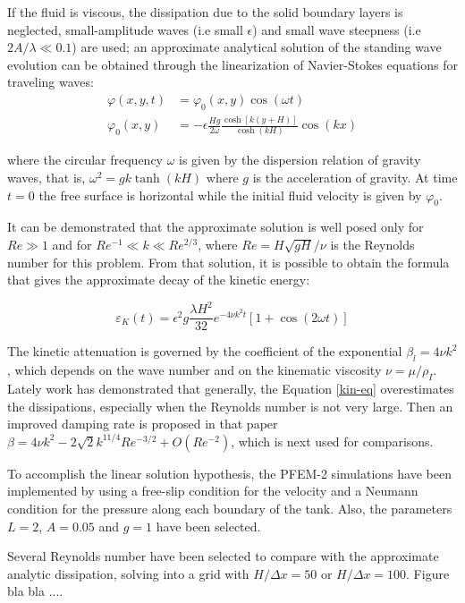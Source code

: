 \documentclass[a4paper,conference]{IEEEtran}
\begin{document}
If the fluid is viscous, the dissipation due to the solid boundary layers is neglected, small-amplitude waves (i.e small $\epsilon$) and small wave steepness (i.e $2A/\lambda \ll 0.1$) are used; an approximate analytical solution of the standing wave evolution can be obtained through the linearization of Navier-Stokes equations for traveling waves:
\begin{align}
 \varphi(x,y,t) & = \varphi_0(x,y)\cos(\omega t) \\
 \varphi_0(x,y) & =-\epsilon\frac{Hg}{2\omega}\frac{\cosh\left[k(y+H)\right]}{\cosh(kH)}\cos(kx)
\end{align}

where the circular frequency $\omega$ is given by the dispersion relation of gravity waves, that is, $\omega^2 = g k \tanh(kH)$ where $g$ is the acceleration of gravity. At time $t = 0$ the free surface is horizontal while the initial fluid velocity is given by $\varphi_0$.

It can be demonstrated that the approximate solution is well posed only for $Re\gg1$ and for $Re^{-1}\ll k \ll Re^{2/3}$, where $Re=H\sqrt{gH}/\nu$ is the Reynolds number for this problem. From that solution, it is possible to obtain the formula that gives the approximate decay of the kinetic energy\cite{Lighthill01}:

\begin{equation}
 \varepsilon_K(t) = \epsilon^2g\frac{\lambda H^2}{32}e^{-4\nu k^2t}\left[1+\cos(2\omega t)\right]
 \label{kin-eq}
\end{equation}

The kinetic attenuation is governed by the coefficient of the exponential $\beta_l = 4\nu k^2$, which depends on the wave number and on the kinematic viscosity $\nu = \mu/\rho_{I}$. Lately work\cite{Antuono13} has demonstrated that generally, the Equation \ref{kin-eq} overestimates the dissipations, especially when the Reynolds number is not very large. Then an improved damping rate is proposed in that paper $\beta = 4\nu k^2 -  2\sqrt{2}k^{11/4}Re^{-3/2}+O(Re^{-2})$, which is next used for comparisons.

To accomplish the linear solution hypothesis, the PFEM-2 simulations have been implemented by using a free-slip condition for the velocity and a Neumann condition for the pressure along each boundary of the tank. Also, the parameters $L=2$, $A=0.05$ and $g=1$ have been selected. 

Several Reynolds number have been selected to compare with the approximate analytic dissipation, solving into a grid with $H/\Delta x=50$ or $H/\Delta x=100$. Figure bla bla ....
\end{document}
